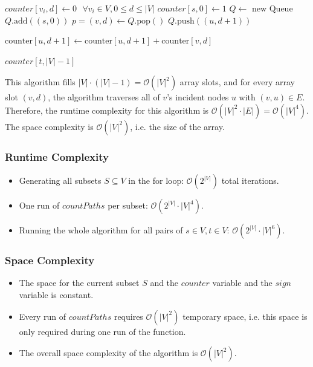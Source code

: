 \documentclass[12pt]{article}
\begin{document}
\begin{algorithmic}
	\State $\mathit{counter}[v_i, d] \gets 0 \mbox{   } \forall v_i \in V, 0 \leq d \leq |V|$
	\State $\mathit{counter}[s, 0] \gets 1$
	\State $Q \gets \mbox{ new Queue}$
	\State $Q.\mbox{add}((s, 0))$
		\State $p=(v, d) \gets Q.\mbox{pop}()$
				\State $Q.\mbox{push}((u, d+1))$
			\EndIf

			\State $\mbox{counter}[u, d+1] \gets \mbox{counter}[u, d+1] + \mbox{counter}[v, d]$
		\EndFor
	\EndWhile

	\Return $\mathit{counter}[t, |V|-1]$
\end{algorithmic}

This algorithm fills $|V| \cdot (|V| - 1) = \mathcal{O}(|V|^2)$ array slots, and for every array slot $(v,d)$, the algorithm traverses all of $v$'s incident nodes $u$ with $(v,u) \in E$. Therefore, the runtime complexity for this algorithm is $\mathcal{O}(|V|^2 \cdot |E|) = \mathcal{O}(|V|^4)$. The space complexity is $\mathcal{O}(|V|^2)$, i.e. the size of the array.

\subsubsection*{Runtime Complexity}
\begin{itemize}
	\item Generating all subsets $S \subseteq V$ in the for loop: $\mathcal{O}(2^{|V|})$ total iterations.
	\item One run of $\mathit{countPaths}$ per subset: $\mathcal{O}(2^{|V|} \cdot |V|^4)$.
	\item Running the whole algorithm for all pairs of $s \in V, t \in V$: $\mathcal{O}(2^{|V|} \cdot |V|^6)$.
\end{itemize}

\subsubsection*{Space Complexity}
\begin{itemize}
	\item The space for the current subset $S$ and the $\mathit{counter}$ variable and the $\mathit{sign}$ variable is constant.
	\item Every run of $\mathit{countPaths}$ requires $\mathcal{O}(|V|^2)$ temporary space, i.e. this space is only required during one run of the function.
	\item The overall space complexity of the algorithm is $\mathcal{O}(|V|^2)$.
\end{itemize}
\end{document}
